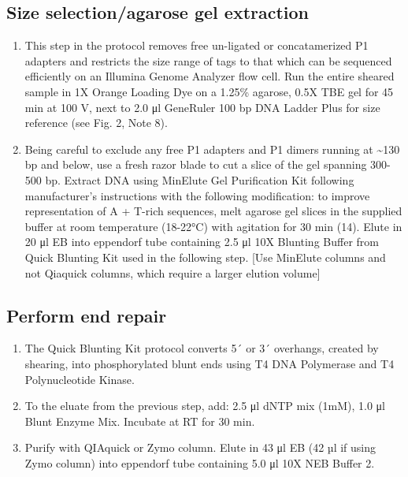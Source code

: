 \documentclass[
  letterpaper,
  DIV=11,
  numbers=noendperiod]{scrreprt}
\providecommand{\tightlist}{%
  \setlength{\itemsep}{0pt}\setlength{\parskip}{0pt}}\usepackage{longtable,booktabs,array}
\begin{document}
\hypertarget{size-selectionagarose-gel-extraction-1}{%
\subsection{Size selection/agarose gel
extraction}\label{size-selectionagarose-gel-extraction-1}}

\begin{enumerate}
\def\labelenumi{\arabic{enumi}.}
\tightlist
\item
  This step in the protocol removes free un-ligated or concatamerized P1
  adapters and restricts the size range of tags to that which can be
  sequenced efficiently on an Illumina Genome Analyzer flow cell. Run
  the entire sheared sample in 1X Orange Loading Dye on a 1.25\%
  agarose, 0.5X TBE gel for 45 min at 100 V, next to 2.0 μl GeneRuler
  100 bp DNA Ladder Plus for size reference (see Fig. 2, Note 8).
\item
  Being careful to exclude any free P1 adapters and P1 dimers running at
  \textasciitilde130 bp and below, use a fresh razor blade to cut a
  slice of the gel spanning 300-500 bp. Extract DNA using MinElute Gel
  Purification Kit following manufacturer's instructions with the
  following modification: to improve representation of A + T-rich
  sequences, melt agarose gel slices in the supplied buffer at room
  temperature (18-22°C) with agitation for 30 min (14). Elute in 20 μl
  EB into eppendorf tube containing 2.5 μl 10X Blunting Buffer from
  Quick Blunting Kit used in the following step. {[}Use MinElute columns
  and not Qiaquick columns, which require a larger elution volume{]}
\end{enumerate}

\hypertarget{perform-end-repair-1}{%
\subsection{Perform end repair}\label{perform-end-repair-1}}

\begin{enumerate}
\def\labelenumi{\arabic{enumi}.}
\tightlist
\item
  The Quick Blunting Kit protocol converts 5´ or 3´ overhangs, created
  by shearing, into phosphorylated blunt ends using T4 DNA Polymerase
  and T4 Polynucleotide Kinase.
\item
  To the eluate from the previous step, add: 2.5 μl dNTP mix (1mM), 1.0
  μl Blunt Enzyme Mix. Incubate at RT for 30 min.
\item
  Purify with QIAquick or Zymo column. Elute in 43 μl EB (42 µl if using
  Zymo column) into eppendorf tube containing 5.0 μl 10X NEB Buffer 2.
\end{enumerate}
\end{document}

